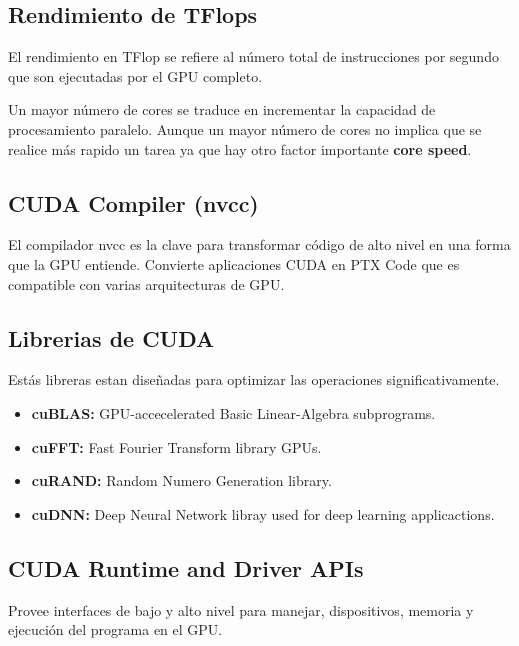 \documentclass[
  letterpaper,
  DIV=11,
  numbers=noendperiod]{scrartcl}
\providecommand{\tightlist}{%
  \setlength{\itemsep}{0pt}\setlength{\parskip}{0pt}}
\begin{document}
\subsection{Rendimiento de TFlops}\label{rendimiento-de-tflops}

El rendimiento en TFlop se refiere al número total de instrucciones por
segundo que son ejecutadas por el GPU completo.

Un mayor número de cores se traduce en incrementar la capacidad de
procesamiento paralelo. Aunque un mayor número de cores no implica que
se realice más rapido un tarea ya que hay otro factor importante
\textbf{core speed}.

\subsection{CUDA Compiler (nvcc)}\label{cuda-compiler-nvcc}

El compilador nvcc es la clave para transformar código de alto nivel en
una forma que la GPU entiende. Convierte aplicaciones CUDA en PTX Code
que es compatible con varias arquitecturas de GPU.

\subsection{Librerias de CUDA}\label{librerias-de-cuda}

Estás libreras estan diseñadas para optimizar las operaciones
significativamente.

\begin{itemize}
\tightlist
\item
  \textbf{cuBLAS:} GPU-accecelerated Basic Linear-Algebra subprograms.
\item
  \textbf{cuFFT:} Fast Fourier Transform library GPUs.
\item
  \textbf{cuRAND:} Random Numero Generation library.
\item
  \textbf{cuDNN:} Deep Neural Network libray used for deep learning
  applicactions.
\end{itemize}

\subsection{CUDA Runtime and Driver
APIs}\label{cuda-runtime-and-driver-apis}

Provee interfaces de bajo y alto nivel para manejar, dispositivos,
memoria y ejecución del programa en el GPU.
\end{document}
